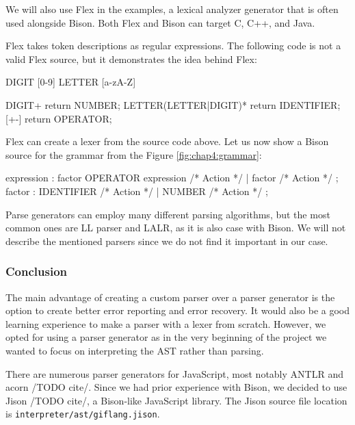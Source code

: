 We will also use Flex in the examples, a lexical analyzer generator that is often used alongside Bison. Both Flex and Bison can target C, C++, and Java.

Flex takes token descriptions as regular expressions. The following code is not a valid Flex source, but it demonstrates the idea behind Flex:
\begin{code}

DIGIT           [0-9]
LETTER          [a-zA-Z]

{DIGIT}+                        return NUMBER;
{LETTER}({LETTER}|{DIGIT})*     return IDENTIFIER;
[+-]                            return OPERATOR;
\end{code}

Flex can create a lexer from the source code above. Let us now show a Bison source for the grammar from the Figure \ref{fig:chap4:grammar}:
\begin{code}


expression
    : factor OPERATOR expression    { /* Action */ }
    | factor                        { /* Action */ }
    ;
factor
    : IDENTIFIER                    { /* Action */ }
    | NUMBER                        { /* Action */ }
    ;
\end{code}

Parse generators can employ many different parsing algorithms, but the most common ones are LL parser and LALR, as it is also case with Bison. We will not describe
the mentioned parsers since we do not find it important in our case.

\subsubsection*{Conclusion}
The main advantage of creating a custom parser over a parser generator is the option to create better error reporting and error recovery. It would also be a
good learning experience to make a parser with a lexer from scratch. However, we opted for using a parser generator as in the very beginning of the project
we wanted to focus on interpreting the AST rather than parsing.

There are numerous parser generators for JavaScript, most notably ANTLR and acorn /TODO cite/. Since we had prior experience with Bison, we decided to use
Jison /TODO cite/, a Bison-like JavaScript library. The Jison source file location is \texttt{interpreter/ast/giflang.jison}.

